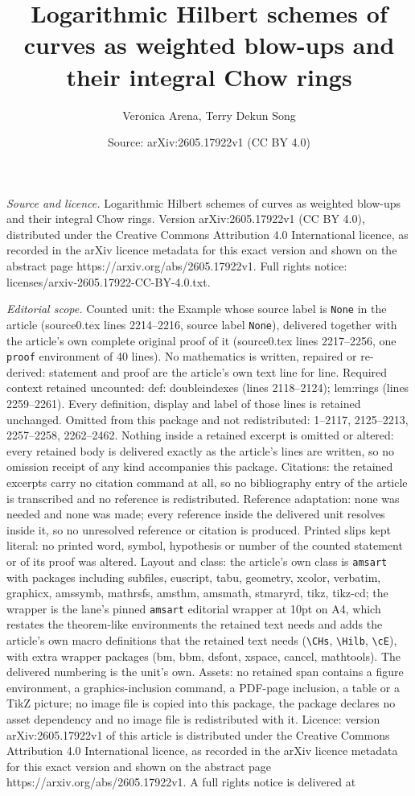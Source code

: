 \documentclass[10pt,a4paper]{amsart}
\title[Logarithmic Hilbert schemes of curves as weighted blow-ups a]{Logarithmic Hilbert schemes of curves as weighted blow-ups and their integral Chow rings}
\author{Veronica Arena, Terry Dekun Song}
\date{Source: arXiv:2605.17922v1 (CC BY 4.0)}
\begin{document}
\maketitle

\noindent\emph{Source and licence.} Logarithmic Hilbert schemes of curves as weighted blow-ups and their integral Chow rings. Version arXiv:2605.17922v1 (CC BY 4.0), distributed under the Creative Commons Attribution 4.0 International licence, as recorded in the arXiv licence metadata for this exact version and shown on the abstract page https://arxiv.org/abs/2605.17922v1. Full rights notice: licenses/arxiv-2605.17922-CC-BY-4.0.txt.\par\smallskip

\noindent\textit{Editorial scope.} Counted unit: the Example whose source label is \texttt{None} in the article (source0.tex lines 2214--2216, source label \texttt{None}), delivered together with the article's own complete original proof of it (source0.tex lines 2217--2256, one \texttt{proof} environment of 40 lines). No mathematics is written, repaired or re-derived: statement and proof are the article's own text line for line. Required context retained uncounted: def: doubleindexes (lines 2118--2124); lem:rings (lines 2259--2261). Every definition, display and label of those lines is retained unchanged. Omitted from this package and not redistributed: 1--2117, 2125--2213, 2257--2258, 2262--2462. Nothing inside a retained excerpt is omitted or altered: every retained body is delivered exactly as the article's lines are written, so no omission receipt of any kind accompanies this package. Citations: the retained excerpts carry no citation command at all, so no bibliography entry of the article is transcribed and no reference is redistributed. Reference adaptation: none was needed and none was made; every reference inside the delivered unit resolves inside it, so no unresolved reference or citation is produced. Printed slips kept literal: no printed word, symbol, hypothesis or number of the counted statement or of its proof was altered. Layout and class: the article's own class is \texttt{amsart} with packages including subfiles, euscript, tabu, geometry, xcolor, verbatim, graphicx, amssymb, mathrsfs, amsthm, amsmath, stmaryrd, tikz, tikz-cd; the wrapper is the lane's pinned \texttt{amsart} editorial wrapper at 10pt on A4, which restates the theorem-like environments the retained text needs and adds the article's own macro definitions that the retained text needs (\texttt{\textbackslash CHs}, \texttt{\textbackslash Hilb}, \texttt{\textbackslash cE}), with extra wrapper packages (bm, bbm, dsfont, xspace, cancel, mathtools). The delivered numbering is the unit's own. Assets: no retained span contains a figure environment, a graphics-inclusion command, a PDF-page inclusion, a table or a TikZ picture; no image file is copied into this package, the package declares no asset dependency and no image file is redistributed with it. Licence: version arXiv:2605.17922v1 of this article is distributed under the Creative Commons Attribution 4.0 International licence, as recorded in the arXiv licence metadata for this exact version and shown on the abstract page https://arxiv.org/abs/2605.17922v1. A full rights notice is delivered at 
\end{document}
